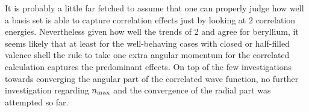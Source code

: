 It is probably a little far fetched to assume
that one can properly judge how well
a \CS basis set is able to capture correlation effects
just by looking at {\MP}2 correlation energies.
Nevertheless given how well the trends of {\MP}2 and \FCI agree for beryllium,
it seems likely that at least for the well-behaving cases
with closed or half-filled valence shell
the rule to take one extra angular momentum for the correlated calculation
captures the predominant effects.
On top of the few investigations towards converging the angular part
of the correlated wave function,
no further investigation regarding $n_\text{max}$
and the convergence of the radial part was attempted so far.
